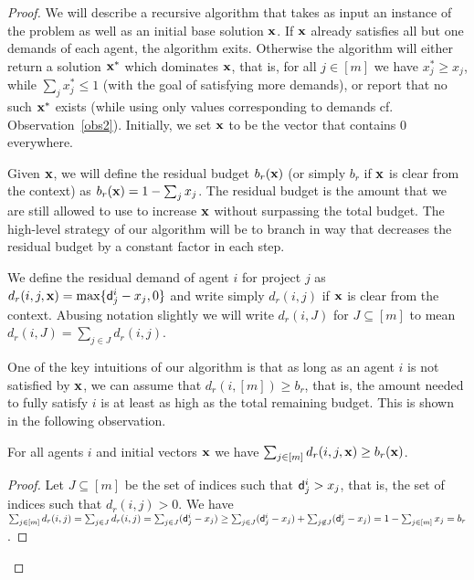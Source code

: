 \documentclass{article}
\begin{document}
\begin{proof} %

We will describe a recursive algorithm that takes as input an instance of the
problem as well as an initial base solution ${\bf x}$. If ${\bf x}$ already satisfies all but one demands of each agent, the algorithm exits. Otherwise the algorithm will either return a solution ${\bf x^*}$ which dominates ${\bf x}$, that is, for
all $j\in[m]$ we have $x^*_j\ge x_j$, while $\sum_j x^*_j\le 1$ (with the goal of satisfying more demands), or report
that no such ${\bf x^*}$ exists (while using only values corresponding to demands cf.~ Observation~\ref{obs2}). Initially, we set ${\bf x}$ to be the vector
that contains $0$ everywhere.

Given ${\bf x}$, we will define the residual budget $b_r({\bf x})$ (or simply
$b_r$ if ${\bf x}$ is clear from the context) as $b_r({\bf x}) = 1-\sum_j x_j$.
The residual budget is the amount that we are still allowed to use to increase
${\bf x}$ without surpassing the total budget. The high-level strategy of our
algorithm will be to branch in way that decreases the residual budget by a
constant factor in each step.

We define the residual demand of agent $i$ for project $j$ as $d_r(i,j,{\bf x})
= \max\{{\sf d}^i_j - x_j,0\}$ and write simply $d_r(i,j)$ if ${\bf x}$ is clear
from the context. Abusing notation slightly we will write $d_r(i,J)$ for
$J\subseteq [m]$ to mean $d_r(i,J)=\sum_{j\in J} d_r(i,j)$.

One of the key intuitions of our algorithm is that as long as an agent $i$ is
not satisfied by $\bf x$, we can assume that $d_r(i,[m])\ge b_r$, that is, the
amount needed to fully satisfy $i$ is at least as high as the total remaining
budget. This is shown in the following observation.

\begin{observation}\label{obs:3} For all agents $i$ and initial vectors $\bf x$
we have $\sum_{j\in [m]} d_r(i,j,{\bf x}) \ge b_r({\bf x})$. \end{observation}

\begin{proof} Let $J\subseteq [m]$ be the set of indices such that ${\sf d}^i_j>
x_j$, that is, the set of indices such that $d_r(i,j)>0$. We have $\sum_{j\in
[m]} d_r(i,j) = \sum_{j\in J} d_r(i,j) = \sum_{j\in J} ({\sf d}^i_j - x_j) \ge
\sum_{j\in J} ({\sf d}^i_j - x_j) + \sum_{j\not\in J} ({\sf d}^i_j - x_j) = 1 -
\sum_{j\in [m]} x_j = b_r$.  \end{proof}


\end{proof}
\end{document}
